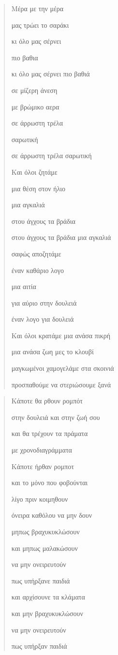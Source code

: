 \documentclass[12pt]{article}
\begin{document}
\begin{verse}
  Μέρα με την μέρα

  μας τρώει το σαράκι

  κι όλο μας σέρνει

  πιο βαθια

  κι όλο μας σέρνει πιο βαθιά

  σε μίζερη άνεση

  με βρώμικο αερα

  σε άρρωστη τρέλα

  σαρωτική

  σε άρρωστη τρέλα σαρωτική

  Και όλοι ζητάμε

  μια θέση στον ήλιο

  μια αγκαλιά

  στου άγχους τα βράδια

  στου άγχους τα βράδια μια αγκαλιά

  σαφώς αποζητάμε

  έναν καθάριο λογο

  μια αιτία

  για αύριο στην δουλειά

  έναν λογο για δουλειά

  Και όλοι κρατάμε μια ανάσα πικρή

  μια ανάσα ζωη μες το κλουβί

  μαγκωμένοι χαμογελάμε στα σκοινιά

  προσπαθούμε να στεριώσουμε ξανά
\end{verse}

\begin{verse}
\end{verse}

\begin{verse}
  Κάποτε θα ρθουν ρομπότ

  στην δουλειά και στην ζωή σου

  και θα τρέχουν τα πράματα

  με χρονοδιαγράμματα

  Κάποτε ήρθαν ρομποτ

  και το μόνο που φοβούνται

  λίγο πριν κοιμηθουν

  όνειρα καθόλου να μην δουν

  μηπως βραχυκυκλώσουν

  και μηπως μαλακώσουν

  να μην ονειρευτούν

  πως υπήρξανε παιδιά

  και αρχίσουνε τα κλάματα

  και μην βραχυκυκλώσουν

  να μην ονειρευτούν

  πως υπήρξαν παιδιά
\end{verse}
\end{document}
